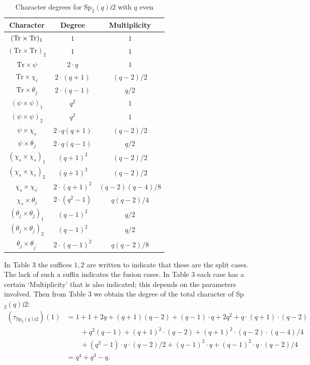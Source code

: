 \documentclass[10pt,a4paper]{amsart}
\theoremstyle{plain}
\theoremstyle{definition}
\numberwithin{equation}{section}
\begin{document}
\begin{table}[h!]
\label{chardegwreath}
\centering
\caption{Character degrees for $\mathrm{Sp}_2(q)\wr 2$ with $q$ even}
\vspace{5pt}
\begin{tabular}{c|cc}
Character & Degree & Multiplicity\\
\hline
$\vphantom{()^{2^2}}(\mathrm{ Tr}\times\mathrm{ Tr})_1$ & $1$ & $1$\\
$(\mathrm{ Tr}\times\mathrm{ Tr})_2$ & $1$ & $1$\\
$\mathrm{ Tr}\times\psi$ & $2\cdot q$ & $1$\\
$\mathrm{ Tr}\times\chi_i$ & $2\cdot(q+1)$ & $(q-2)/2$\\
$\mathrm{ Tr}\times\theta_j$ & $2\cdot (q-1)$ & $q/2$\\
$(\psi\times\psi)_1$ & $q^2$ & $1$\\
$(\psi\times\psi)_2$ & $q^2$ & $1$\\
$\psi\times\chi_s$ & $2\cdot q(q+1)$ & $(q-2)/2$\\
$\psi\times\theta_j$ & $2\cdot q(q-1)$ & $q/2$\\
$(\chi_s\times\chi_s)_1$ & $(q+1)^2$ & $(q-2)/2$\\
$(\chi_s\times\chi_s)_2$ & $(q+1)^2$ & $(q-2)/2$\\
$\chi_s\times\chi_{s^\prime}$ & $2\cdot (q+1)^2$ & $(q-2)(q-4)/8$\\
$\chi_s\times\theta_j$ & $2\cdot(q^2-1)$ & $q(q-2)/4$\\
$(\theta_j\times\theta_j)_1$ & $(q-1)^2$ & $q/2$\\
$(\theta_j\times\theta_j)_2$ & $(q-1)^2$ & $q/2$\\
$\theta_j\times\theta_{j^\prime}$ & $2\cdot (q-1)^2$ & $q(q-2)/8$
\end{tabular}
\end{table}

In Table 3 the suffices $1,2$ are written to indicate that these  are the split cases. The lack of such a suffix indicates the fusion cases. 
In Table 3 each case has a certain `Multiplicity' that is also indicated; this  depends on the parameters involved. 
Then from 
 Table 3 we obtain the degree of the total character of  Sp$_2(q)\wr 2$:
\begin{align*}
(\tau_{\mathrm{Sp}_2(q)\wr 2})(1)
&=1 + 1 + 2 q + (q + 1) (q - 2) + (q - 1) \cdot q + 2 q^2 + q\cdot(q + 1)\cdot (q - 2)\\ & \qquad + q^2 (q - 1)
 + (q + 1)^2 \cdot(q - 2) + (q + 1)^2\cdot (q - 2)\cdot (q - 4)/4\\& \qquad + (q^2 - 1)\cdot q\cdot (q - 2)/2 + (q - 1)^2\cdot q
 + (q - 1)^2\cdot q\cdot (q - 2)/4 \\&
= q^4+q^3-q.
\end{align*}
\end{document}
